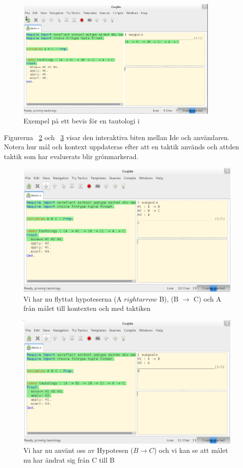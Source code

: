 \begin{figure}[H]
  \centering
  \includegraphics[width=100mm]{images/Proof_part1}
  \caption[Exempel på bevis i \coq{}]
   {Exempel på ett bevis för en tautologi i \coq{}}
  \label{fig:bevis1}
\end{figure}

Figurerna ~\ref{fig:bevis2} och ~\ref{fig:bevis3} visar den interaktiva
biten mellan \coq Ide och användaren. Notera hur mål och kontext uppdateras
efter att en taktik används och attden taktik som har evaluerats blir grönmarkerad.


\begin{figure}[H]
  \centering
  \includegraphics[width=150mm]{images/Proof_part2}
  \caption[Bevis i \coq{} Ide]
   {Vi har nu flyttat hypoteserna (A $rightarrow$ B), (B $\rightarrow$ C) och A
    från målet till kontexten och med taktiken }
  \label{fig:bevis2}
\end{figure}

\begin{figure}[H]
  \centering
  \includegraphics[width=150mm]{images/Proof_part3}
  \caption[Bevis i \coq{} Ide]
   {Vi har nu använt oss av Hypotesen ($B \rightarrow C$) och vi
    kan se att målet nu har ändrat sig från C till B}
  \label{fig:bevis3}
\end{figure}